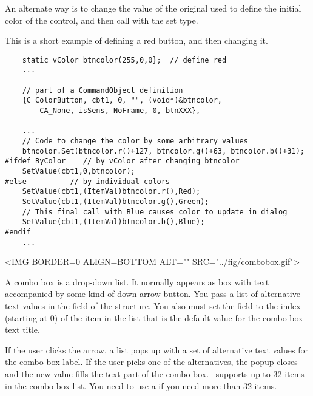 An alternate way is to change the value of the original 
used to define the initial color of the control, and then call
 with the  set type.

This is a short example of defining a red button, and then changing it.

\footnotesize
\begin{verbatim}
    static vColor btncolor(255,0,0};  // define red
    ...

    // part of a CommandObject definition
    {C_ColorButton, cbt1, 0, "", (void*)&btncolor,
        CA_None, isSens, NoFrame, 0, btnXXX},

    ...
    // Code to change the color by some arbitrary values
    btncolor.Set(btncolor.r()+127, btncolor.g()+63, btncolor.b()+31);
#ifdef ByColor    // by vColor after changing btncolor
    SetValue(cbt1,0,btncolor);
#else          // by individual colors
    SetValue(cbt1,(ItemVal)btncolor.r(),Red);
    SetValue(cbt1,(ItemVal)btncolor.g(),Green);
    // This final call with Blue causes color to update in dialog
    SetValue(cbt1,(ItemVal)btncolor.b(),Blue);
#endif
    ...
\end{verbatim}
\normalfont\normalsize


\small
\begin{rawhtml}
<IMG BORDER=0 ALIGN=BOTTOM ALT="" SRC="../fig/combobox.gif">
\end{rawhtml}
\begin{latexonly}

\end{latexonly}
\normalfont\normalsize
\vspace{.1in}

A combo box is a drop-down list. It normally
appears as box with text accompanied by some kind of down arrow
button. You pass a list of alternative text values in the 
field of the  structure. You also must set
the  field to the index (starting at 0) of the item
in the list that is the default value for the combo box text
title.

If the user clicks the arrow, a list pops up with a set of
alternative text values for the combo box label. If the user
picks one of the alternatives, the popup closes and the new value
fills the text part of the combo box. \V\ supports up to 32
items in the combo box list. You need to use a  if
you need more than 32 items.

